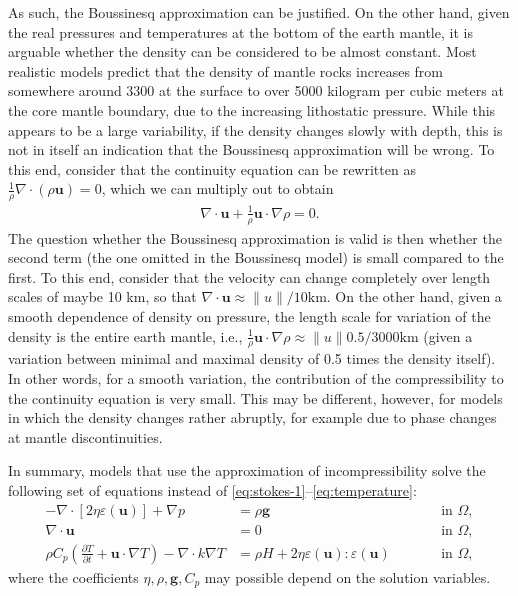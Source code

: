 \documentclass{article}
\begin{document}
As such, the Boussinesq approximation can be justified. On the other hand,
given the real pressures and temperatures at the bottom of the earth mantle,
it is arguable whether the density can be considered to be almost
constant. Most realistic models predict that the density of mantle rocks
increases from somewhere around 3300 at the surface to over 5000 kilogram per
cubic meters at the core mantle boundary, due to the increasing lithostatic
pressure. While this appears to be a large variability, if the density changes
slowly with depth, this is not in itself an indication that the Boussinesq
approximation will be wrong. To this end, consider that the continuity
equation can be rewritten as $\frac 1\rho \nabla \cdot (\rho \mathbf u)=0$,
which we can multiply out to obtain
\begin{gather*}
  \nabla \cdot \mathbf u
  +
  \frac 1\rho \mathbf u \cdot \nabla \rho
  = 0.
\end{gather*}
The question whether the Boussinesq approximation is valid is then whether the
second term (the one omitted in the Boussinesq model) is small compared to the
first. To this end, consider that the velocity can change completely over length
scales of maybe 10 km, so that $\nabla \cdot\mathbf u \approx \|u\| /
10\text{km}$. On the other hand, given a smooth dependence of density on pressure,
the length scale for variation of the density is the entire earth mantle,
i.e., $\frac 1\rho \mathbf u \cdot \nabla\rho \approx \|u\| 0.5 / 3000 \text{km}$
(given a variation between minimal and maximal density of 0.5 times the
density itself). In other words, for a smooth variation, the contribution of
the compressibility to the continuity equation is very small. This may be
different, however, for models in which the density changes rather abruptly,
for example due to phase changes at mantle discontinuities.

In summary, models that use the approximation of incompressibility solve the
following set of equations instead of \eqref{eq:stokes-1}--\eqref{eq:temperature}:
\begin{align}
  \label{eq:stokes-1-boussinesq}
  -\nabla \cdot \left[2\eta \varepsilon(\mathbf u)
                \right] + \nabla p &=
  \rho \mathbf g
  & \qquad
  & \textrm{in $\Omega$},
  \\
  \label{eq:stokes-2-boussinesq}
  \nabla \cdot \mathbf u &= 0
  & \qquad
  & \textrm{in $\Omega$},
  \\
  \label{eq:temperature-boussinesq}
  \rho C_p \left(\frac{\partial T}{\partial t} + \mathbf u\cdot\nabla T\right)
  - \nabla\cdot k\nabla T
  &=
  \rho H
  +
  2\eta
  \varepsilon(\mathbf u)
  :
  \varepsilon(\mathbf u)
  & \quad
  & \textrm{in $\Omega$},
\end{align}
where the coefficients $\eta,\rho,\mathbf g,C_p$ may possible depend on the
solution variables.
\end{document}
